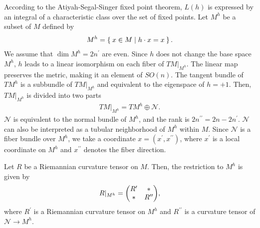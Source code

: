 \documentclass[11pt]{article}
\begin{document}
According to the Atiyah-Segal-Singer fixed point theorem, $L(h)$ is expressed by an integral of a characteristic class over the set of fixed points. Let $M^h$ be a subset of $M$ defined by
\begin{align}
    M^h=\Set{x \in M | h\cdot x=x }.
\end{align}
We assume that $\dim M^h=2n^\prime$ are even. Since $h$ does not change the base space $M^h$, $h$ leads to a linear isomorphism on each fiber of $TM |_{M^h}$. The linear map preserves the metric, making it an element of $SO(n)$. The tangent bundle of $TM^h$ is a subbundle of $TM |_{M^h}$ and equivalent to the eigenspace of $h=+1$. Then, $TM |_{M^h}$ is divided into two parts
\begin{align}
    TM |_{M^h}=TM^h \oplus \mathcal{N}.
\end{align}
$\mathcal{N}$ is equivalent to the normal bundle of $M^h$, and the rank is $2n^{\prime \prime}=2n-2n^\prime$. $\mathcal{N}$ can also be interpreted as a tubular neighborhood of $M^h$ within $M$. Since $\mathcal{N}$ is a fiber bundle over $M^h$, we take a coordinate $x=(x^\prime, x^{\prime \prime})$, where $x^\prime$ is a local coordinate on $M^h$ and $x^{\prime \prime}$ denotes the fiber direction.


 
Let $R$ be a Riemannian curvature tensor on $M$. Then, the restriction to $M^h$ is given by
\begin{align}
    R|_{M^h}= \mqty( R^{\prime} & \ast \\ \ast & R^{\prime \prime}),
\end{align}
where $R^\prime$ is a Riemannian curvature tensor on $M^h$ and $R^{\prime \prime}$ is a curvature tensor of $\mathcal{N}\to M^h$. 
\end{document}
